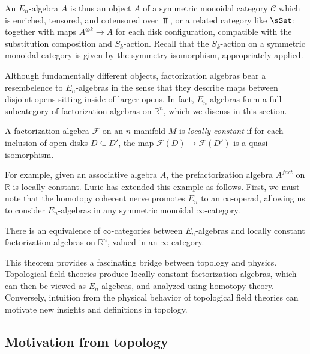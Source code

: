 An $E_n$-algebra $A$ is thus an object $A$ of a symmetric monoidal category $\mathcal{C} $ which is enriched, tensored, and cotensored over $\Top $, or a related category like $\sSet $; together with maps $A^{\otimes k} \to A$ for each disk configuration, compatible with the substitution composition and $S_k$-action. Recall that the $S_k$-action on a symmetric monoidal category is given by the symmetry isomorphism, appropriately applied.

Although fundamentally different objects, factorization algebras bear a resembelence to $E_n$-algebras in the sense that they describe maps between disjoint opens sitting inside of larger opens. In fact, $E_n$-algebras form a full subcategory of factorization algebras on $\mathbb{R} ^n$, which we discuss in this section.

\begin{definition}\label{dfn:6-4-1}
	A factorization algebra $\mathcal{F} $ on an $n$-manifold $M$ is \emph{locally constant} if for each inclusion of open disks $D \subseteq D'$, the map $\mathcal{F}(D)\to \mathcal{F} (D')$ is a quasi-isomorphism.
\end{definition}

For example, given an associative algebra $A$, the prefactorization algebra $A^{fact} $ on $\mathbb{R} $ is locally constant. Lurie has extended this example as follows. First, we must note that the homotopy coherent nerve promotes $E_n$ to an $\infty $-operad, allowing us to consider $E_n$-algebras in any symmetric monoidal $\infty $-category.

\begin{theorem}\label{thm:6-4-2}
	There is an equivalence of $\infty $-categories between $E_n$-algebras and locally constant factorization algebras on $\mathbb{R} ^n$, valued in an $\infty $-category.
\end{theorem}

This theorem provides a fascinating bridge between topology and physics. Topological field theories produce locally constant factorization algebras, which can then be viewed as $E_n$-algebras, and analyzed using homotopy theory. Conversely, intuition from the physical behavior of topological field theories can motivate new insights and definitions in topology.

\subsection{Motivation from topology}

